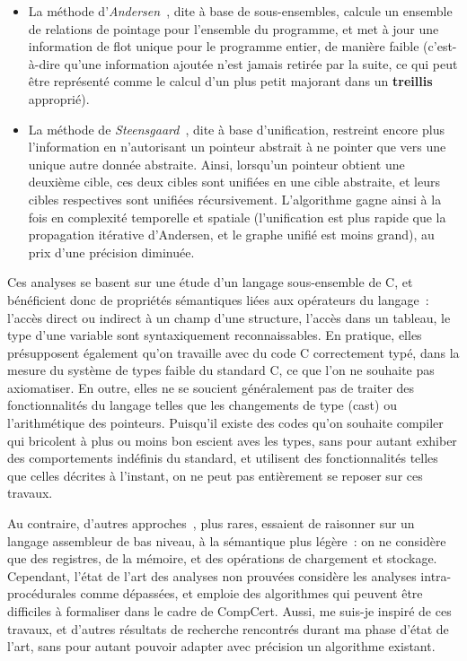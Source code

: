 \documentclass{article}
\begin{document}
\begin{itemize}

\item La méthode d'{\it Andersen}~\cite{And94}, dite à base de sous-ensembles,
calcule un ensemble de relations de pointage pour l'ensemble du programme, et
met à jour une information de flot unique pour le programme entier, de manière
faible (c'est-à-dire qu'une information ajoutée n'est jamais retirée par la
suite, ce qui peut être représenté comme le calcul d'un plus petit majorant
dans un {\bf \gls{treillis}} approprié).

\item La méthode de {\it Steensgaard}~\cite{Ste96}, dite à base d'unification,
restreint encore plus l'information en n'autorisant un pointeur abstrait à ne
pointer que vers une unique autre donnée abstraite. Ainsi, lorsqu'un pointeur
obtient une deuxième cible, ces deux cibles sont unifiées en une cible
abstraite, et leurs cibles respectives sont unifiées récursivement.
L'algorithme gagne ainsi à la fois en complexité temporelle et spatiale
(l'unification est plus rapide que la propagation itérative d'Andersen, et le
graphe unifié est moins grand), au prix d'une précision diminuée.

\end{itemize}

Ces analyses se basent sur une étude d'un langage sous-ensemble de C, et
bénéficient donc de propriétés sémantiques liées aux opérateurs du langage~:
l'accès direct ou indirect à un champ d'une structure, l'accès dans un tableau,
le type d'une variable sont syntaxiquement reconnaissables. En pratique, elles
présupposent également qu'on travaille avec du code C correctement typé, dans
la mesure du système de types faible du standard C, ce que l'on ne souhaite pas
axiomatiser. En outre, elles ne se soucient généralement pas de traiter des
fonctionnalités du langage telles que les changements de type (cast) ou
l'arithmétique des pointeurs. Puisqu'il existe des codes qu'on souhaite
compiler qui bricolent à plus ou moins bon escient aves les types, sans pour
autant exhiber des comportements indéfinis du standard, et utilisent des
fonctionnalités telles que celles décrites à l'instant, on ne peut pas
entièrement se reposer sur ces travaux.

Au contraire, d'autres approches~\cite{Guo05}, plus rares, essaient de
raisonner sur un langage assembleur de bas niveau, à la sémantique plus
légère~: on ne considère que des registres, de la mémoire, et des opérations de
chargement et stockage. Cependant, l'état de l'art des analyses non prouvées
considère les analyses intra-procédurales comme dépassées, et emploie des
algorithmes qui peuvent être difficiles à formaliser dans le cadre de CompCert.
Aussi, me suis-je inspiré de ces travaux, et d'autres résultats de recherche
rencontrés durant ma phase d'état de l'art, sans pour autant pouvoir adapter
avec précision un algorithme existant.
\end{document}
